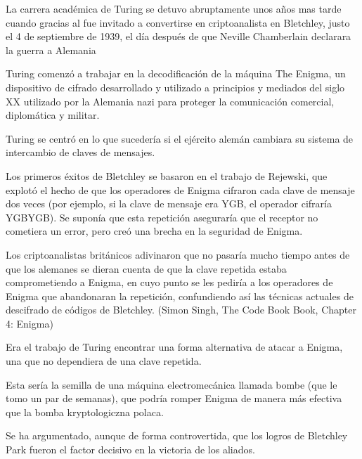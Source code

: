 \documentclass[12pt, fleqn]{report}                             %
\newcommand \Quote              {\qq}                           %
\theoremstyle{break}                                            %
\begin{document}
                La carrera académica de Turing se detuvo abruptamente unos años mas tarde
                cuando gracias al \Quote{Government Code and Cypher School} fue invitado a convertirse en
                criptoanalista en Bletchley, justo el 4 de septiembre de 1939,
                el día después de que Neville Chamberlain declarara la guerra a Alemania

                Turing comenzó a trabajar en la decodificación de la máquina The Enigma, 
                un dispositivo de cifrado desarrollado y utilizado a principios y mediados del
                siglo XX utilizado por la Alemania nazi para proteger la comunicación comercial,
                diplomática y militar.

                Turing se centró en lo que sucedería si el ejército alemán cambiara su sistema
                de intercambio de claves de mensajes.
                
                Los primeros éxitos de Bletchley se basaron en el trabajo de Rejewski, que explotó el hecho de
                que los operadores de Enigma cifraron cada clave de mensaje dos veces
                (por ejemplo, si la clave de mensaje era YGB, el operador cifraría YGBYGB).
                Se suponía que esta repetición aseguraría que el receptor no cometiera un error, pero creó
                una brecha en la seguridad de Enigma.  

                Los criptoanalistas británicos adivinaron que no
                pasaría mucho tiempo antes de que los alemanes se dieran cuenta de que la clave repetida
                estaba comprometiendo a Enigma, en cuyo punto se les pediría a los operadores
                de Enigma que abandonaran la repetición, confundiendo así las técnicas actuales de descifrado de
                códigos de Bletchley. (Simon Singh, The Code Book Book, Chapter 4: Enigma)
                
                Era el trabajo de Turing encontrar una forma alternativa de atacar a Enigma,
                una que no dependiera de una clave repetida.

                Esta sería la semilla de una máquina electromecánica llamada bombe (que le tomo un par de semanas), 
                que podría romper Enigma de manera más efectiva que la bomba kryptologiczna polaca.

                Se ha argumentado, aunque de forma controvertida, que los logros de Bletchley Park 
                fueron el factor decisivo en la victoria de los aliados.
                
\end{document}
